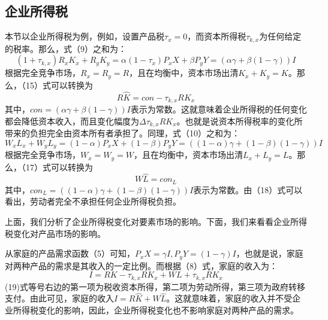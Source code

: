 \documentclass[cn,10pt,math=newtx,citestyle=gb7714-2015,bibstyle=gb7714-2015]{elegantbook}
\begin{document}
	\subsection{企业所得税}
	本节以企业所得税为例，例如，设置产品税$\tau_x=0$，而资本所得税$\tau_{k,x}$为任何给定的税率。那么，式（9）之和为：
	\begin{equation}
		(1+\tau_{k,x})R_xK_x+R_yK_y=\alpha(1-\tau_x)P_xX+\beta P_yY=(\alpha \gamma +\beta (1-\gamma)) I
	\end{equation}
	根据完全竞争市场，$R_x=R_y=R$，且在均衡中，资本市场出清$K_x+K_y=K$。那么，（15）式可以转换为
	\begin{equation}
		R\hat{K}=con-\tau_{k,x}RK_x
	\end{equation}
	其中，$con=(\alpha \gamma +\beta (1-\gamma)) I$表示为常数。这就意味着企业所得税的任何变化都会降低资本收入，而且变化幅度为$\Delta\tau_{k,x}RK_x$。也就是说资本所得税率的变化所带来的负担完全由资本所有者承担了。同理，式（10）之和为：
	\begin{equation}
		W_xL_x+W_yL_y=(1-\alpha)P_xX+(1-\beta) P_yY=((1-\alpha)\gamma +(1-\beta)(1-\gamma)) I
	\end{equation}
	根据完全竞争市场，$W_x=W_y=W$，且在均衡中，资本市场出清$L_x+L_y=L$。那么，（17）式可以转换为
	\begin{equation}
		W\hat{L}=con_L
	\end{equation}
	其中，$con_L=((1-\alpha)\gamma +(1-\beta)(1-\gamma)) I$表示为常数。由（18）式可以看出，劳动者完全不承担任何企业所得税负担。
	
	上面，我们分析了企业所得税变化对要素市场的影响。下面，我们来看看企业所得税变化对产品市场的影响。
	
	从家庭的产品需求函数（5）可知，$P_xX=\gamma I,P_yY=(1-\gamma)I$，也就是说，家庭对两种产品的需求是其收入的一定比例。而根据（8）式，家庭的收入为：
	\begin{equation}
		I=RK-\tau_{k,x}RK_x+WL+\tau_{k,x}RK_x
	\end{equation}
	(19)式等号右边的第一项为税收资本所得，第二项为劳动所得，第三项为政府转移支付。由此可见，家庭的收入$I=R\hat{K}+W\hat{L}$。这就意味着，家庭的收入并不受企业所得税变化的影响，因此，企业所得税变化也不影响家庭对两种产品的需求。
	
\end{document}
